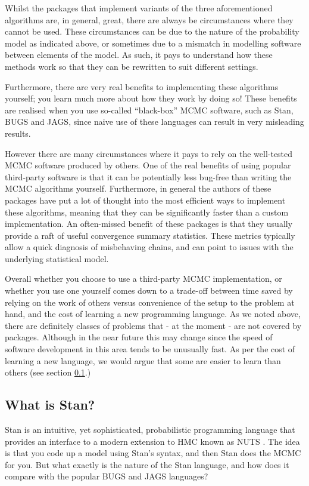 \documentclass[11pt,fullpage]{book}
\begin{document}
Whilst the packages that implement variants of the three aforementioned algorithms are, in general, great, there are always be circumstances where they cannot be used. These circumstances can be due to the nature of the probability model as indicated above, or sometimes due to a mismatch in modelling software between elements of the model. As such, it pays to understand how these methods work so that they can be rewritten to suit different settings.

Furthermore, there are very real benefits to implementing these algorithms yourself; you learn much more about how they work by doing so! These benefits are realised when you use so-called ``black-box'' MCMC software, such as Stan, BUGS and JAGS, since naive use of these languages can result in very misleading results. 

However there are many circumstances where it pays to rely on the well-tested MCMC software produced by others. One of the real benefits of using popular third-party software is that it can be potentially less bug-free than writing the MCMC algorithms yourself. Furthermore, in general the authors of these packages have put a lot of thought into the most efficient ways to implement these algorithms, meaning that they can be significantly faster than a custom implementation. An often-missed benefit of these packages is that they usually provide a raft of useful convergence summary statistics. These metrics typically allow a quick diagnosis of misbehaving chains, and can point to issues with the underlying statistical model.

Overall whether you choose to use a third-party MCMC implementation, or whether you use one yourself comes down to a trade-off between time saved by relying on the work of others versus convenience of the setup to the problem at hand, and the cost of learning a new programming language. As we noted above, there are definitely classes of problems that - at the moment - are not covered by packages. Although in the near future this may change since the speed of software development in this area tends to be unusually fast. As per the cost of learning a new language, we would argue that some are easier to learn than others (see section \ref{sec:StanJags_whatIsStan}.)

\subsection{What is Stan?}\label{sec:StanJags_whatIsStan}
Stan is an intuitive, yet sophisticated, probabilistic programming language that provides an interface to a modern extension to HMC known as NUTS \citep{carpenter2016stan}. The idea is that you code up a model using Stan's syntax, and then Stan does the MCMC for you. But what exactly is the nature of the Stan language, and how does it compare with the popular BUGS and JAGS languages?
\end{document}
